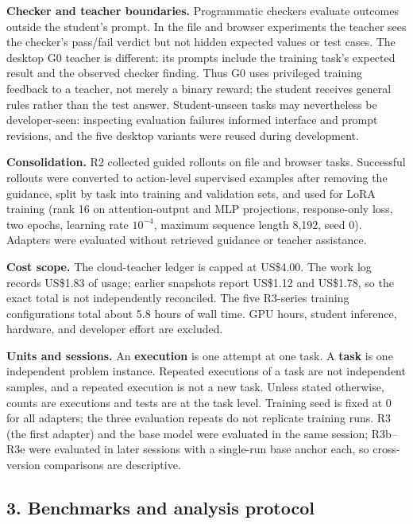 \documentclass[
  10pt,
]{article}
\begin{document}
\textbf{Checker and teacher boundaries.} Programmatic checkers evaluate
outcomes outside the student's prompt. In the file and browser
experiments the teacher sees the checker's pass/fail verdict but not
hidden expected values or test cases. The desktop G0 teacher is
different: its prompts include the training task's expected result and
the observed checker finding. Thus G0 uses privileged training feedback
to a teacher, not merely a binary reward; the student receives general
rules rather than the test answer. Student-unseen tasks may nevertheless
be developer-seen: inspecting evaluation failures informed interface and
prompt revisions, and the five desktop variants were reused during
development.

\textbf{Consolidation.} R2 collected guided rollouts on file and browser
tasks. Successful rollouts were converted to action-level supervised
examples after removing the guidance, split by task into training and
validation sets, and used for LoRA training (rank 16 on attention-output
and MLP projections, response-only loss, two epochs, learning rate
\(10^{-4}\), maximum sequence length 8,192, seed 0). Adapters were
evaluated without retrieved guidance or teacher assistance.

\textbf{Cost scope.} The cloud-teacher ledger is capped at US\$4.00. The
work log records US\$1.83 of usage; earlier snapshots report US\$1.12
and US\$1.78, so the exact total is not independently reconciled. The
five R3-series training configurations total about 5.8 hours of wall
time. GPU hours, student inference, hardware, and developer effort are
excluded.

\textbf{Units and sessions.} An \textbf{execution} is one attempt at one
task. A \textbf{task} is one independent problem instance. Repeated
executions of a task are not independent samples, and a repeated
execution is not a new task. Unless stated otherwise, counts are
executions and tests are at the task level. Training seed is fixed at 0
for all adapters; the three evaluation repeats do not replicate training
runs. R3 (the first adapter) and the base model were evaluated in the
same session; R3b--R3e were evaluated in later sessions with a
single-run base anchor each, so cross-version comparisons are
descriptive.

\subsection{3. Benchmarks and analysis
protocol}\label{benchmarks-and-analysis-protocol}
\end{document}
